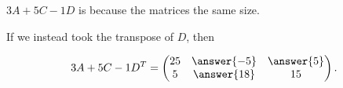 \documentclass{ximera}
\begin{document}
\begin{exploration}
\begin{enumerate}
\begin{solution}
  $3A+5C-1D$ is  because the matrices  the same size.

  \begin{problem}

    If we instead took the transpose of $D$, then 
    
    $$3A+5C-1D^T=\begin{pmatrix} 25 & \answer{-5} & \answer{5} \\ 5 & \answer{18} & 15 \end{pmatrix}.$$

  \end{problem}

\end{solution}

\end{enumerate}

\end{exploration}
\end{document}
